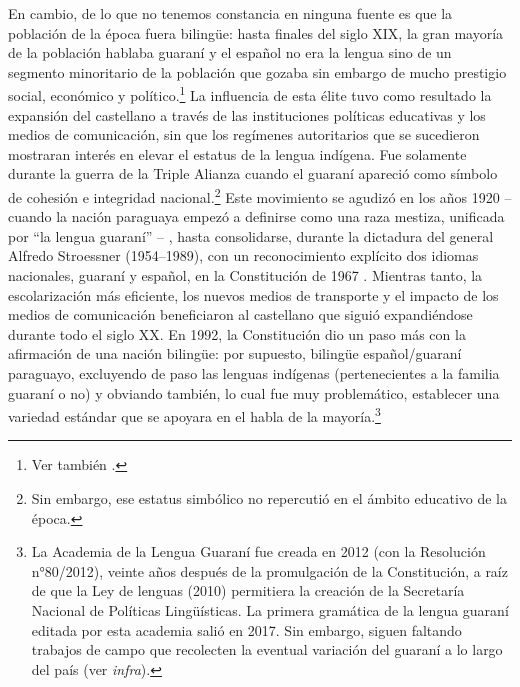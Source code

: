 \documentclass[output=paper]{langscibook}
\begin{document}
\largerpage[-2]
En cambio, de lo que no tenemos constancia en ninguna fuente es que la población de la época fuera bilingüe: hasta finales del siglo XIX, la gran mayoría de la población hablaba guaraní \citep{Melià1992} y el español no era la lengua sino de un segmento minoritario de la población que gozaba sin embargo de mucho prestigio social, económico y político.\footnote{Ver también \citet[27 \textit{et seq.}]{Zajícová2009}.} La influencia de esta élite tuvo como resultado la expansión del castellano a través de las instituciones políticas educativas y los medios de comunicación, sin que los regímenes autoritarios que se sucedieron mostraran interés en elevar el estatus de la lengua indígena. Fue solamente durante la guerra de la Triple Alianza cuando el guaraní apareció como símbolo de cohesión e integridad nacional.\footnote{Sin embargo, ese estatus simbólico no repercutió en el ámbito educativo de la época.} Este movimiento se agudizó en los años 1920 -- cuando la nación paraguaya empezó a definirse como una raza mestiza, unificada por “la lengua guaraní” -- , hasta consolidarse, durante la dictadura del general Alfredo Stroessner (1954--1989), con un reconocimiento explícito dos idiomas nacionales, guaraní y español, en la Constitución de 1967 \citep{Boidin2014a}. Mientras tanto, la escolarización más eficiente, los nuevos medios de transporte y el impacto de los medios de comunicación beneficiaron al castellano que siguió expandiéndose durante todo el siglo XX. En 1992, la Constitución dio un paso más con la afirmación de una nación bilingüe: por supuesto, bilingüe español/guaraní paraguayo, excluyendo de paso las lenguas indígenas (pertenecientes a la familia guaraní o no) y obviando también, lo cual fue muy problemático, establecer una variedad estándar que se apoyara en el habla de la mayoría.\footnote{La Academia de la Lengua Guaraní fue creada en 2012 (con la Resolución n°80/2012), veinte años después de la promulgación de la Constitución, a raíz de que la Ley de lenguas (2010) permitiera la creación de la Secretaría Nacional de Políticas Lingüísticas. La primera gramática de la lengua guaraní editada por esta academia salió en 2017. Sin embargo, siguen faltando trabajos de campo que recolecten la eventual variación del guaraní a lo largo del país (ver \textit{infra}).}
\end{document}
